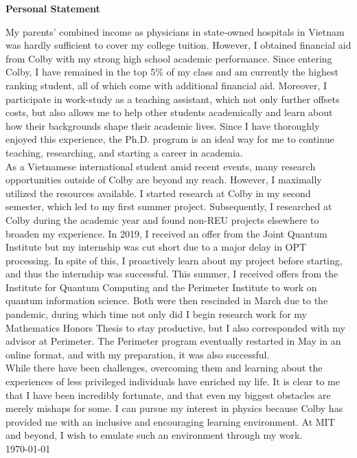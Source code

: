 \documentclass[12pt]{article}
\begin{document}
\begin{center}
	\textbf{Personal Statement}
\end{center}
My parents' combined income as physicians in state-owned hospitals in Vietnam was hardly sufficient to cover my college tuition. However, I obtained financial aid from Colby with my strong high school academic performance. Since entering Colby, I have remained in the top 5\% of my class and am currently the highest ranking student, all of which come with additional financial aid. Moreover, I participate in work-study as a teaching assistant, which not only further offsets costs, but also allows me to help other students academically and learn about how their backgrounds shape their academic lives. Since I have thoroughly enjoyed this experience, the Ph.D. program is an ideal way for me to continue teaching, researching, and starting a career in academia. \\


As a Vietnamese international student amid recent events, many research opportunities outside of Colby are beyond my reach. However, I maximally utilized the resources available. I started research at Colby in my second semester, which led to my first summer project. Subsequently, I researched at Colby during the academic year and found non-REU projects elsewhere to broaden my experience. In 2019, I received an offer from the Joint Quantum Institute but my internship was cut short due to a major delay in OPT processing. In spite of this, I proactively learn about my project before starting, and thus the internship was successful. This summer, I received offers from the Institute for Quantum Computing and the Perimeter Institute to work on quantum information science. Both were then rescinded in March due to the pandemic, during which time not only did I begin research work for my Mathematics Honors Thesis to stay productive, but I also corresponded with my advisor at Perimeter. The Perimeter program eventually restarted in May in an online format, and with my preparation, it was also successful.\\

While there have been challenges, overcoming them and learning about the experiences of less privileged individuals have enriched my life. It is clear to me that I have been incredibly fortunate, and that even my biggest obstacles are merely mishaps for some. I can pursue my interest in physics because Colby has provided me with an inclusive and encouraging learning environment. At MIT and beyond, I wish to emulate such an environment through my work. \\

\noindent \today
\end{document}
